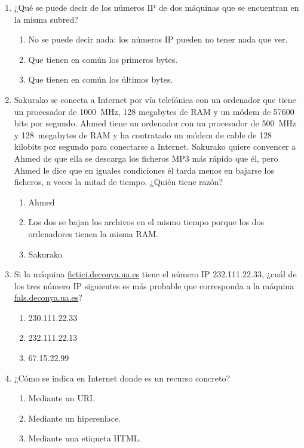 \begin{enumerate}
\item ¿Qué se puede decir de los números IP de dos máquinas que se encuentran en la misma subred? \begin{enumerate} \item No se  puede decir nada: los números IP pueden no tener nada que ver. \item Que tienen en común los primeros bytes. \item Que tienen en común los últimos bytes. \end{enumerate} 

\item Sakurako se conecta a Internet por vía telefónica con un ordenador que tiene un procesador de 1000~MHz, 128 megabytes de RAM y un módem de 57600 bits por segundo. Ahmed tiene un ordenador con un procesador de 500~MHz y 128~megabytes de RAM y ha contratado un módem de cable de 128 kilobits por segundo para conectarse a Internet. Sakurako quiere convencer a Ahmed de que ella se descarga los ficheros MP3 más rápido que él, pero Ahmed le dice que en iguales condiciones él tarda menos en bajarse los ficheros, a veces la mitad de tiempo. ¿Quién tiene razón? \begin{enumerate} \item Ahmed \item Los dos se bajan los archivos en el mismo tiempo porque los dos ordenadores tienen la misma RAM. \item Sakurako \end{enumerate} 

\item Si la máquina \url{fictici.deconya.ua.es} tiene el número IP 232.111.22.33, ¿cuál de los tres número IP siguientes es más probable que corresponda a la máquina \url{fals.deconya.ua.es}? \begin{enumerate} \item 230.111.22.33 \item 232.111.22.13 \item 67.15.22.99 \end{enumerate} 

\item ¿Cómo se indica en Internet donde es un recurso concreto? \begin{enumerate} \item Mediante un URI. \item Mediante un hiperenlace. \item Mediante una etiqueta HTML. \end{enumerate} 


\end{enumerate}
